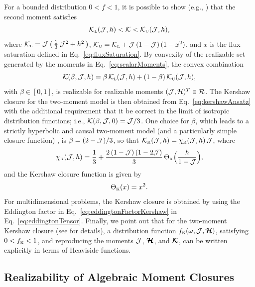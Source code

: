 For a bounded distribution $0<f<1$, it is possible to show (e.g., \cite{banachLarecki_2013}) that the second moment satisfies
\begin{equation}
  \mathcal{K}_{\mbox{\tiny L}}(\mathcal{J},h) < \mathcal{K} < \mathcal{K}_{\mbox{\tiny U}}(\mathcal{J},h),
\end{equation}
where $\mathcal{K}_{\mbox{\tiny L}}=\mathcal{J}\,\big(\,\frac{1}{3}\,\mathcal{J}^{2}+h^{2}\,\big)$, $\mathcal{K}_{\mbox{\tiny U}}=\mathcal{K}_{\mbox{\tiny L}} + \mathcal{J}\,(1-\mathcal{J})\,(1-x^{2})$, and $x$ is the flux saturation defined in Eq.~\eqref{eq:fluxSaturation}.  
By convexity of the realizable set generated by the moments in Eq.~\eqref{eq:scalarMoments}, the convex combination
\begin{equation}
  \mathcal{K}(\beta,\mathcal{J},h)=\beta\,\mathcal{K}_{\mbox{\tiny L}}(\mathcal{J},h)+(1-\beta)\,\mathcal{K}_{\mbox{\tiny U}}(\mathcal{J},h),
  \label{eq:kershawAnsatz}
\end{equation}
with $\beta\in[0,1]$, is realizable for realizable moments $(\mathcal{J},\mathcal{H})^{T}\in\mathcal{R}$.  
The Kershaw closure for the two-moment model is then obtained from Eq.~\eqref{eq:kershawAnsatz} with the additional requirement that it be correct in the limit of isotropic distribution functions; i.e., $\mathcal{K}(\beta,\mathcal{J},0)=\mathcal{J}/3$.  
One choice for $\beta$, which leads to a strictly hyperbolic and causal two-moment model (and a particularly simple closure function) \cite{banachLarecki_2017a}, is $\beta=(2-\mathcal{J})/3$, so that $\mathcal{K}_{\mbox{\tiny K}}(\mathcal{J},h)=\chi_{\mbox{\tiny K}}(\mathcal{J},h)\,\mathcal{J}$, where
\begin{equation}
  \chi_{\mbox{\tiny K}}(\mathcal{J},h)=\frac{1}{3}+\frac{2\,(1-\mathcal{J})\,(1-2\mathcal{J})}{3}\,\Theta_{\mbox{\tiny K}}\Big(\frac{h}{1-\mathcal{J}}\Big),
  \label{eq:eddingtonFactorKershaw}
\end{equation}
and the Kershaw closure function is given by
\begin{equation}
  \Theta_{\mbox{\tiny K}}(x)=x^{2}.  
\end{equation}
For multidimensional problems, the Kershaw closure is obtained by using the Eddington factor in Eq.~\eqref{eq:eddingtonFactorKershaw} in Eq.~\eqref{eq:eddingtonTensor}.  
Finally, we point out that for the two-moment Kershaw closure (see \cite{banachLarecki_2017a} for details), a distribution function $f_{\mbox{\tiny K}}(\omega,\mathcal{J},\boldsymbol{\mathcal{H}})$, satisfying $0 < f_{\mbox{\tiny K}} < 1$, and reproducing the moments $\mathcal{J}$, $\boldsymbol{\mathcal{H}}$, and $\boldsymbol{\mathcal{K}}$, can be written explicitly in terms of Heaviside functions.  

\subsection{Realizability of Algebraic Moment Closures}

